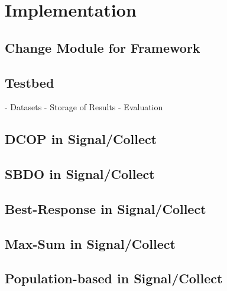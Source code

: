 \chapter{Implementation}
\section{Change Module for Framework}
\section{Testbed}

- Datasets
- Storage of Results
- Evaluation

\section{DCOP in Signal/Collect}
\section{SBDO in Signal/Collect}
\section{Best-Response in Signal/Collect}
\section{Max-Sum in Signal/Collect}
\section{Population-based in Signal/Collect}